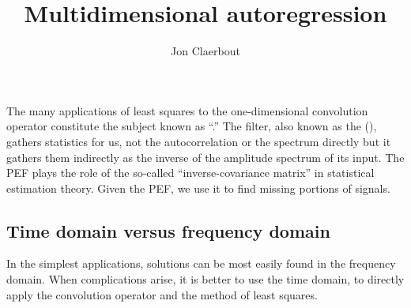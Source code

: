 \long{}

\title{Multidimensional autoregression}
\author{Jon Claerbout}
\maketitle
\label{paper:mda}

        The many applications of least squares
        to the one-dimensional convolution operator
        constitute the subject known as ``.''
        The {\it {}} filter,
        also known as the  (),
        gathers statistics for us,
        not the autocorrelation or the spectrum directly
        but it gathers them indirectly
        as the inverse of the amplitude spectrum of its input.
        The PEF plays the role of the so-called
        ``inverse-covariance matrix'' in statistical estimation theory.
        Given the PEF, we use it to find missing portions of signals.


\subsection{Time domain versus frequency domain}
\par
In the simplest applications, solutions can be most easily found
in the frequency domain.
When complications arise,
it is better to use the time domain,
to directly apply the convolution operator
and the method of least squares.


